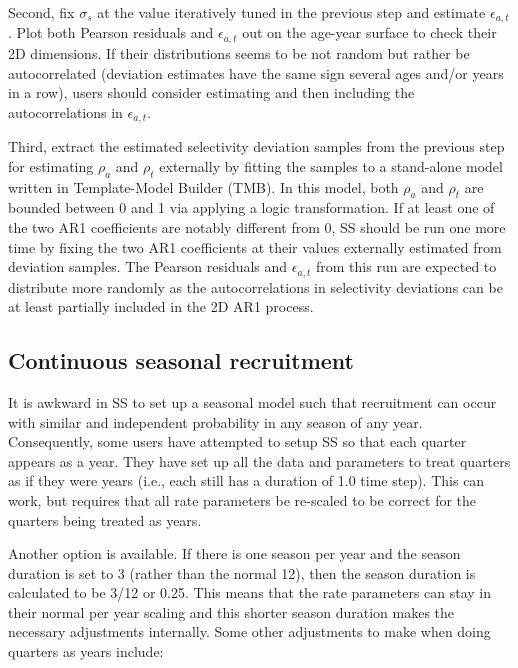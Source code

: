 Second, fix $\sigma_s$ at the value iteratively tuned in the previous step and estimate $\epsilon_{a,t}$. Plot both Pearson residuals and $\epsilon_{a,t}$ out on the age-year surface to check their 2D dimensions. If their distributions seems to be not random but rather be autocorrelated (deviation estimates have the same sign several ages and/or years in a row), users should consider estimating and then including the autocorrelations in $\epsilon_{a,t}$.

Third, extract the estimated selectivity deviation samples from the previous step for estimating $\rho_a$ and $\rho_t$ externally by fitting the samples to a stand-alone model written in Template-Model Builder (TMB). In this model, both $\rho_a$ and $\rho_t$ are bounded between 0 and 1 via applying a logic transformation. If at least one of the two AR1 coefficients are notably different from 0, SS should be run one more time by fixing the two AR1 coefficients at their values externally estimated from deviation samples. The Pearson residuals and $\epsilon_{a,t}$ from this run are expected to distribute more randomly as the  autocorrelations in selectivity deviations can be at least partially included in the 2D AR1 process.


\subsection{Continuous seasonal recruitment}
It is awkward in SS to set up a seasonal model such that recruitment can occur with similar and independent probability in any season of any year.  Consequently, some users have attempted to setup SS so that each quarter appears as a year.  They have set up all the data and parameters to treat quarters as if they were years (i.e., each still has a duration of 1.0 time step).  This can work, but requires that all rate parameters be re-scaled to be correct for the quarters being treated as years.

Another option is available.  If there is one season per year and the season duration is set to 3 (rather than the normal 12), then the season duration is calculated to be 3/12 or 0.25. This means that the rate parameters can stay in their normal per year scaling and this shorter season duration makes the necessary adjustments internally. Some other adjustments to make when doing quarters as years include:


